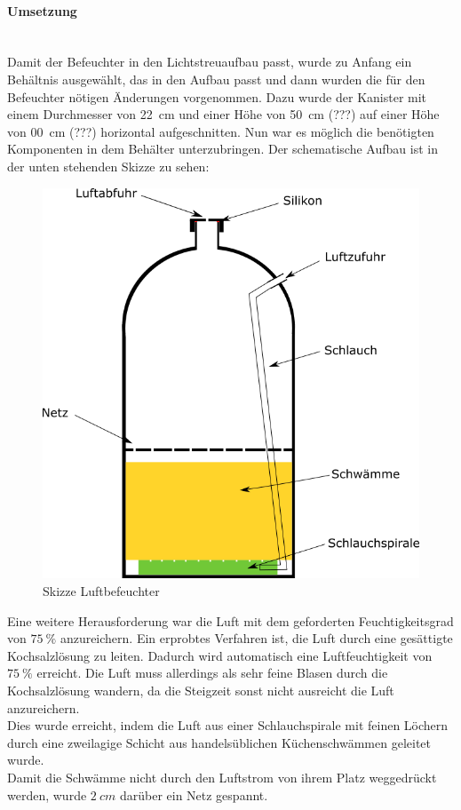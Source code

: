 \paragraph{Umsetzung}

\hfill \\

Damit der Befeuchter in den Lichtstreuaufbau passt, wurde zu Anfang ein Behältnis ausgewählt, das in den Aufbau passt und dann wurden die für den Befeuchter nötigen Änderungen vorgenommen. Dazu wurde der Kanister mit einem Durchmesser von \SI{22}{cm} und einer Höhe von \SI{50}{cm} (???) auf einer Höhe von \SI{00}{cm} (???) horizontal aufgeschnitten. Nun war es möglich die benötigten Komponenten in dem Behälter unterzubringen. Der schematische Aufbau ist in der unten stehenden Skizze zu sehen: \\

\begin{figure}[h]
	\begin{center}
		\includegraphics[scale=0.6]{Luftbefeuchter.png}
		\caption{Skizze Luftbefeuchter}
	\end{center}
\end{figure}

Eine weitere Herausforderung war die Luft mit dem geforderten Feuchtigkeitsgrad von $\SI{75}{\%}$ anzureichern. Ein erprobtes Verfahren ist, die Luft durch eine gesättigte Kochsalzlösung zu leiten. Dadurch wird automatisch eine Luftfeuchtigkeit von $\SI{75}{\%}$ erreicht. Die Luft muss allerdings als sehr feine Blasen durch die Kochsalzlösung wandern, da die Steigzeit sonst nicht ausreicht die Luft anzureichern. \\
Dies wurde erreicht, indem die Luft aus einer Schlauchspirale mit feinen Löchern durch eine zweilagige Schicht aus handelsüblichen Küchenschwämmen geleitet wurde. \\
Damit die Schwämme nicht durch den Luftstrom von ihrem Platz weggedrückt werden, wurde $\SI{2}{cm}$ darüber ein Netz gespannt.

